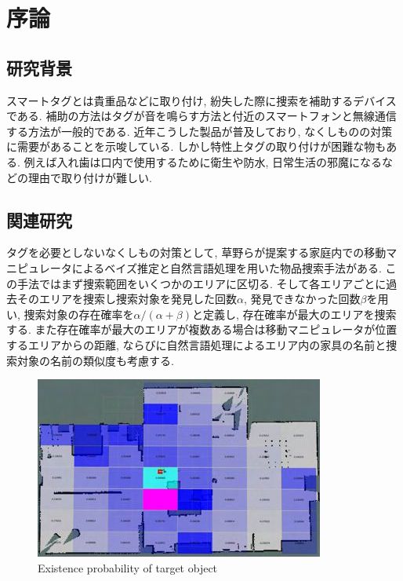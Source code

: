 \chapter{序論}

\section{研究背景}
スマートタグとは貴重品などに取り付け, 紛失した際に捜索を補助するデバイスである. 
補助の方法はタグが音を鳴らす方法と付近のスマートフォンと無線通信する方法が一般的である. 
近年こうした製品が普及しており, なくしものの対策に需要があることを示唆している. 
しかし特性上タグの取り付けが困難な物もある. 
例えば入れ歯は口内で使用するために衛生や防水, 日常生活の邪魔になるなどの理由で取り付けが難しい. 

\section{関連研究}
タグを必要としないなくしもの対策として, 草野らが提案する家庭内での移動マニピュレータによるベイズ推定と自然言語処理を用いた物品捜索手法\cite{kusano}がある. 
この手法ではまず捜索範囲をいくつかのエリアに区切る. 
そして各エリアごとに過去そのエリアを捜索し捜索対象を発見した回数$\alpha$, 発見できなかった回数$\beta$を用い, 
捜索対象の存在確率を$ \alpha / (\alpha + \beta)$と定義し, 存在確率が最大のエリアを捜索する. 
また存在確率が最大のエリアが複数ある場合は移動マニピュレータが位置するエリアからの距離, ならびに自然言語処理によるエリア内の家具の名前と捜索対象の名前の類似度も考慮する. 

\begin{figure}[H]
    \begin{center}
        \includegraphics[width=0.8\linewidth]{figs/kusano.jpg}
        \caption{Existence probability of target object}
        \label{fig:kusano}
    \end{center}
\end{figure}

